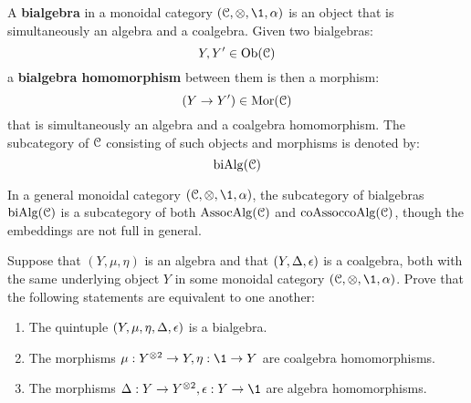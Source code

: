         \begin{definition} \label{def: bialgebras_in_monoidal_categories}
            A \textbf{bialgebra} in a monoidal category $(\C, \tensor, \1, \alpha)$ is an object that is simultaneously an algebra and a coalgebra. Given two bialgebras:
                $$Y, Y' \in \mathrm{Ob}(\mathcal{C})$$
            a \textbf{bialgebra homomorphism} between them is then a morphism:
                $$(Y \to Y') \in \mathrm{Mor}(\mathcal{C})$$
            that is simultaneously an algebra and a coalgebra homomorphism. The subcategory of $\mathcal{C}$ consisting of such objects and morphisms is denoted by:
                $$\mathrm{bi}\mathrm{Alg}(\mathcal{C})$$
        \end{definition}
        \begin{remark}
            In a general monoidal category $(\C, \tensor, \1, \alpha)$, the subcategory of bialgebras $\mathrm{bi}\mathrm{Alg}(\mathcal{C})$ is a subcategory of both $\mathrm{Assoc}\mathrm{Alg}(\mathcal{C})$ and $\mathrm{co}\mathrm{Assoc}\mathrm{co}\mathrm{Alg}(\mathcal{C})$, though the embeddings are not full in general.
        \end{remark}
        \begin{question}
            Suppose that $(Y, \mu, \eta)$ is an algebra and that $(Y, \Delta, \epsilon)$ is a coalgebra, both with the same underlying object $Y$ in some monoidal category $(\C, \tensor, \1, \alpha)$. Prove that the following statements are equivalent to one another:
            \begin{enumerate}
                \item The quintuple $(Y, \mu, \eta, \Delta, \epsilon)$ is a bialgebra.
                \item The morphisms $\mu: Y^{\tensor 2} \to Y, \eta: \1 \to Y$ are coalgebra homomorphisms.
                \item The morphisms $\Delta: Y \to Y^{\tensor 2}, \e: Y \to \1$ are algebra homomorphisms.
            \end{enumerate}
        \end{question}

